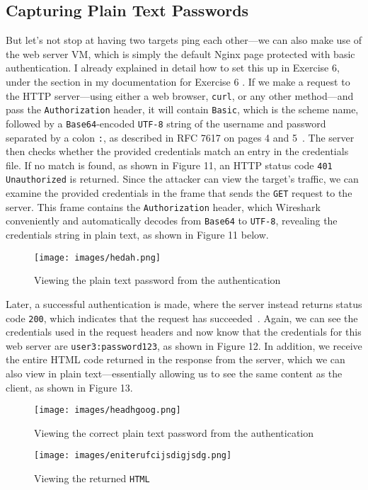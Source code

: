 \documentclass[a4paper]{article}
\newcommand{\abc}{\hfill \break}
\begin{document}
\subsection{Capturing Plain Text Passwords}
But let's not stop at having two targets ping each other—we can also make use of the web server VM, which is simply the default Nginx page protected with basic authentication. I already explained in detail how to set this up in Exercise 6, under the  section in my documentation for Exercise 6 \cite{exercise-6}.\abc
If we make a request to the HTTP server—using either a web browser, \texttt{curl}, or any other method—and pass the \texttt{Authorization} header, it will contain \texttt{Basic}, which is the scheme name, followed by a \texttt{Base64}-encoded \texttt{UTF-8} string of the username and password separated by a colon \texttt{:}, as described in RFC 7617 on pages 4 and 5~\cite{basic-auth-rfc}.\abc
The server then checks whether the provided credentials match an entry in the credentials file. If no match is found, as shown in Figure 11, an HTTP status code \texttt{401 Unauthorized} is returned. \cite{http-401}\abc
Since the attacker can view the target’s traffic, we can examine the provided credentials in the frame that sends the \texttt{GET} request to the server. This frame contains the \texttt{Authorization} header, which Wireshark conveniently and automatically decodes from \texttt{Base64} to \texttt{UTF-8}, revealing the credentials string in plain text, as shown in Figure 11 below.
\begin{figure}[!htbp]
	\texttt{[image: images/hedah.png]}
	\centering
	\caption{Viewing the plain text password from the authentication}
\end{figure} \abc 
Later, a successful authentication is made, where the server instead returns status code \texttt{200}, which indicates that the request has succeeded~\cite{http-200}.\abc
Again, we can see the credentials used in the request headers and now know that the credentials for this web server are \texttt{user3:password123}, as shown in Figure 12. In addition, we receive the entire HTML code returned in the response from the server, which we can also view in plain text—essentially allowing us to see the same content as the client, as shown in Figure 13.
\begin{figure}[!htbp]
	\texttt{[image: images/headhgoog.png]}
	\centering
	\caption{Viewing the correct plain text password from the authentication}
\end{figure} \abc \newpage
\begin{figure}[!htbp]
	\texttt{[image: images/eniterufcijsdigjsdg.png]}
	\centering
	\caption{Viewing the returned \texttt{HTML}}
\end{figure} \abc
\end{document}
